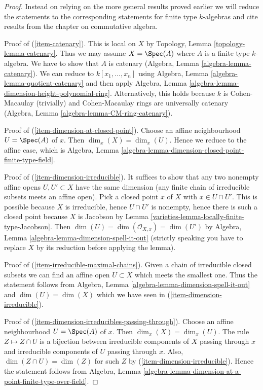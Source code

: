 \begin{proof}

Instead on relying on the more general results proved earlier
we will reduce the statements to the corresponding statements
for finite type $k$-algebras and cite results from the chapter
on commutative algebra.

\medskip\noindent
Proof of (\ref{item-catenary}). This is local on $X$ by
Topology, Lemma \ref{topology-lemma-catenary}. Thus we may
assume $X = \Spec(A)$ where $A$ is a finite type $k$-algebra.
We have to show that $A$ is catenary
(Algebra, Lemma \ref{algebra-lemma-catenary}).
We can reduce to $k[x_1, \ldots, x_n]$ using
Algebra, Lemma \ref{algebra-lemma-quotient-catenary} and then apply
Algebra, Lemma \ref{algebra-lemma-dimension-height-polynomial-ring}.
Alternatively, this holds because $k$ is Cohen-Macaulay (trivially) and
Cohen-Macaulay rings are universally catenary
(Algebra, Lemma \ref{algebra-lemma-CM-ring-catenary}).

\medskip\noindent
Proof of (\ref{item-dimension-at-closed-point}). Choose an affine
neighbourhood $U = \Spec(A)$ of $x$. Then $\dim_x(X) = \dim_x(U)$.
Hence we reduce to the affine case, which is
Algebra, Lemma \ref{algebra-lemma-dimension-closed-point-finite-type-field}.

\medskip\noindent
Proof of (\ref{item-dimension-irreducible}). It suffices to show that
any two nonempty affine opens $U, U' \subset X$ have the same dimension
(any finite chain of irreducible subsets meets an affine open).
Pick a closed point $x$ of $X$ with $x \in U \cap U'$. This is possible
because $X$ is irreducible, hence $U \cap U'$ is nonempty, hence there is
such a closed point because $X$ is Jacobson by
Lemma \ref{varieties-lemma-locally-finite-type-Jacobson}. Then
$\dim(U) = \dim(\mathcal{O}_{X, x}) = \dim(U')$ by
Algebra, Lemma \ref{algebra-lemma-dimension-spell-it-out}
(strictly speaking you have to replace $X$ by its reduction before
applying the lemma).

\medskip\noindent
Proof of (\ref{item-irreducible-maximal-chains}). Given a chain
of irreducible closed subsets we can find an affine open $U \subset X$
which meets the smallest one. Thus the statement follows from
Algebra, Lemma \ref{algebra-lemma-dimension-spell-it-out}
and $\dim(U) = \dim(X)$ which we have seen in
(\ref{item-dimension-irreducible}).

\medskip\noindent
Proof of (\ref{item-dimension-irreducibles-passing-through}).
Choose an affine neighbourhood $U = \Spec(A)$ of $x$. Then
$\dim_x(X) = \dim_x(U)$. The rule $Z \mapsto Z \cap U$
is a bijection between irreducible components of $X$ passing through
$x$ and irreducible components of $U$ passing through $x$.
Also, $\dim(Z \cap U) = \dim(Z)$ for such $Z$ by
(\ref{item-dimension-irreducible}).
Hence the statement follows from
Algebra, Lemma \ref{algebra-lemma-dimension-at-a-point-finite-type-over-field}.


\end{proof}
